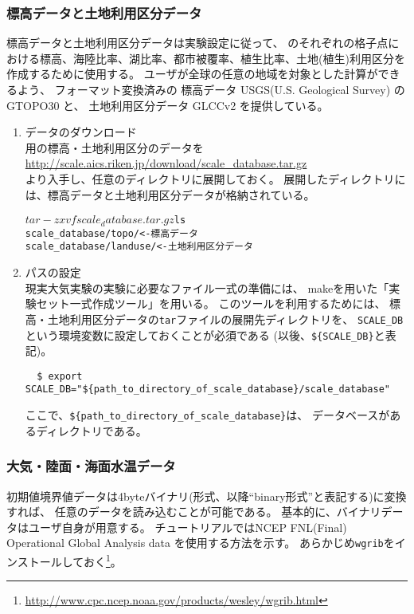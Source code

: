 \subsubsection{標高データと土地利用区分データ}
標高データと土地利用区分データは実験設定に従って、
\scalerm のそれぞれの格子点における標高、海陸比率、湖比率、都市被覆率、植生比率、土地(植生)利用区分を
作成するために使用する。
ユーザが全球の任意の地域を対象とした計算ができるよう、
フォーマット変換済みの
標高データ USGS(U.S. Geological Survey) のGTOPO30 と、
土地利用区分データ GLCCv2 を提供している。

\begin{enumerate}
\item データのダウンロード\\
\scalerm 用の標高・土地利用区分のデータを\\
 \url{http://scale.aics.riken.jp/download/scale_database.tar.gz}\\
より入手し、任意のディレクトリに展開しておく。
展開したディレクトリには、標高データと土地利用区分データが格納されている。
\begin{alltt}
  $ tar -zxvf scale_database.tar.gz
  $ ls
    scale_database/topo/    <- 標高データ
    scale_database/landuse/ <- 土地利用区分データ
\end{alltt}

\item パスの設定\\
現実大気実験の実験に必要なファイル一式の準備には、
makeを用いた「実験セット一式作成ツール」を用いる。
このツールを利用するためには、
標高・土地利用区分データの\verb|tar|ファイルの展開先ディレクトリを、
\verb|SCALE_DB| という環境変数に設定しておくことが必須である (以後、\verb|${SCALE_DB}|と表記)。
\begin{verbatim}
  $ export SCALE_DB="${path_to_directory_of_scale_database}/scale_database"
\end{verbatim}
ここで、\verb|${path_to_directory_of_scale_database}|は、
データベースがあるディレクトリである。
\end{enumerate}



\subsubsection{大気・陸面・海面水温データ}
初期値境界値データは4byteバイナリ(\grads 形式、以降``binary形式''と表記する)に変換すれば、
任意のデータを読み込むことが可能である。
基本的に、バイナリデータはユーザ自身が用意する。
チュートリアルではNCEP FNL(Final) Operational Global Analysis data を使用する方法を示す。
あらかじめ\verb|wgrib|をインストールしておく\footnote{\url{http://www.cpc.ncep.noaa.gov/products/wesley/wgrib.html}}。

